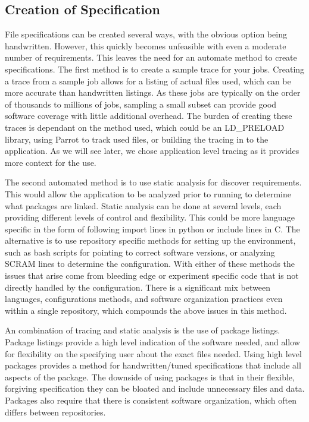 \documentclass[sigconf]{acmart}
\begin{document}
\subsection{Creation of Specification}
File specifications can be created several ways,
with the obvious option being handwritten.
However, this quickly becomes unfeasible with
even a moderate number of requirements.
This leaves the need for an automate method to create
specifications.
The first method is to create a sample trace for your
jobs. 
Creating a trace from a sample job allows 
for a listing of actual files used, which
can be more accurate than handwritten listings.
As these jobs are typically on the order of thousands
to millions of jobs, sampling a small subset
can provide good software coverage with little
additional overhead. %
The burden of creating these traces is
dependant on the method used,
which could be an LD\_PRELOAD library,
using Parrot to track used files, %
or building the tracing in to the application.
As we will see later, we chose application
level tracing as it provides more context
for the use.

The second automated method is to use static
analysis for discover requirements.
This would allow the application to be analyzed
prior to running to determine what packages are
linked.
Static analysis can be done at several levels,
each providing different levels of control 
and flexibility.
This could be more language specific in the 
form of following import lines in python or
include lines in C.
The alternative is to use repository specific 
methods for setting up the environment,
such as bash scripts for pointing to correct 
software versions, or 
analyzing SCRAM\cite{DBLP:journals/corr/cs-OH-0306014} lines
to determine the configuration.
With either of these methods the issues
that arise come from bleeding edge or
experiment specific code that is not directly
handled by the configuration.
There is a significant mix between languages,
configurations methods, and software organization
practices even within a single repository,
which compounds the above issues in this method.

An combination of tracing and static analysis is the
use of package listings. 
Package listings provide a high level indication
of the software needed, and allow for 
flexibility on the specifying user about the
exact files needed.
Using high level packages provides a method
for handwritten/tuned specifications that 
include all aspects of the package.
The downside of using packages is that in
their flexible, forgiving specification
they can be bloated and include unnecessary
files and data.
Packages also require that there is consistent
software organization, which often differs
between repositories.
\end{document}
